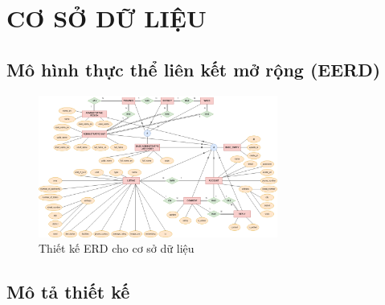 \newpage
\section{CƠ SỞ DỮ LIỆU}
\subsection{Mô hình thực thể liên kết mở rộng (EERD)}
\begin{figure}[H]
    \centering
    \includegraphics[angle=270,width=0.7\textwidth]{Images/Database/ERD.png}
    \caption{Thiết kế ERD cho cơ sở dữ liệu}
\end{figure}
\subsection{Mô tả thiết kế}
